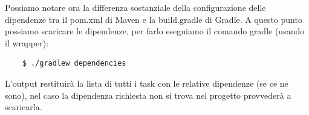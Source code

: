 Possiamo notare ora la differenza sostanziale della configurazione delle dipendenze tra il pom.xml di Maven e la build.gradle di Gradle. A questo punto possiamo scaricare le dipendenze, per farlo eseguiamo il comando gradle (usando il wrapper): 
\begin{verbatim}
    $ ./gradlew dependencies \end{verbatim}
L'output restituirà la lista di tutti i task con le relative dipendenze (se ce ne sono), nel caso la dipendenza richiesta non si trova nel progetto provvederà a scaricarla.